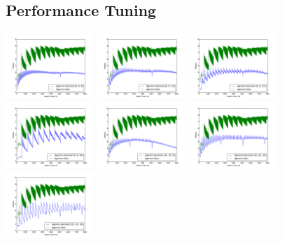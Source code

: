 \documentclass[12pt]{article}
\begin{document}
\subsection*{Performance Tuning}
	\includegraphics[width=0.25\textwidth]{graphs/profiles/PROFILE_OUTUT_8_8.pdf}  
	\includegraphics[width=0.25\textwidth]{graphs/profiles/PROFILE_OUTUT_8_16.pdf}  
	\includegraphics[width=0.25\textwidth]{graphs/profiles/PROFILE_OUTUT_8_32.pdf} 
	\includegraphics[width=0.25\textwidth]{graphs/profiles/PROFILE_OUTUT_8_64.pdf} 
	\includegraphics[width=0.25\textwidth]{graphs/profiles/PROFILE_OUTUT_16_8.pdf}  
	\includegraphics[width=0.25\textwidth]{graphs/profiles/PROFILE_OUTUT_16_16.pdf}  
	\includegraphics[width=0.25\textwidth]{graphs/profiles/PROFILE_OUTUT_32_32.pdf} 
\end{document}
